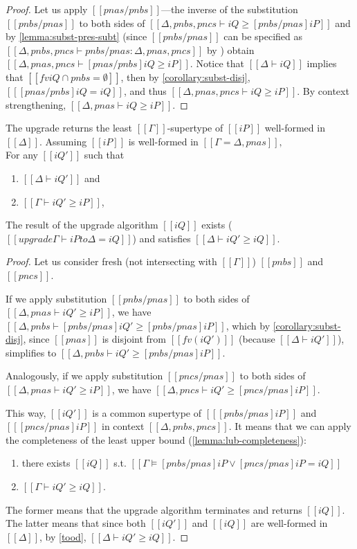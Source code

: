 \begin{proof}
    Let us apply $[[pnas/pnbs]]$---the inverse of the substitution $[[ pnbs/pnas ]]$ to 
    both sides of $[[Δ, pnbs, pncs ⊢ iQ ≥ [pnbs/pnas]iP]]$ and 
    by \cref{lemma:subst-pres-subt} 
    (since $[[pnbs/pnas]]$ can be specified as 
    $[[Δ,pnbs,pncs ⊢ pnbs/pnas : Δ, pnas, pncs]]$ by \label{lemma:subst-domain-weakening})
    obtain $[[Δ, pnas, pncs ⊢ [pnas/pnbs]iQ ≥ iP]]$.
    Notice that $[[Δ ⊢ iQ]]$ implies that $[[fv iQ ∩ {pnbs} = ∅]]$, 
    then by \cref{corollary:subst-disj}, $[[ [pnas/pnbs]iQ = iQ]]$,
     and thus $[[Δ, pnas, pncs ⊢ iQ ≥ iP]]$.
    By context strengthening, $[[Δ, pnas ⊢ iQ ≥ iP]]$.
\end{proof}

\begin{lemma} \label{lemma:upgrade-completeness}
    The upgrade returns the least $[[Γ]]$-supertype of $[[iP]]$ well-formed in $[[Δ]]$.
    Assuming $[[iP]]$ is well-formed in $[[Γ = Δ, pnas]],$\\
    For any $[[iQ']]$ such that 
    \begin{enumerate}
        \item $[[Δ ⊢ iQ']]$ and
        \item $[[Γ ⊢ iQ' ≥ iP]]$,
    \end{enumerate}

    The result of the upgrade algorithm $[[iQ]]$ exists
    ($[[upgrade Γ ⊢ iP to Δ = iQ]]$) and satisfies $[[Δ ⊢ iQ' ≥ iQ]]$.
\end{lemma}
\begin{proof}

    Let us consider fresh (not intersecting with $[[Γ]]$) $[[pnbs]]$ and $[[pncs]]$.

    If we apply substitution $[[pnbs/pnas]]$ to both sides of $[[Δ, pnas ⊢ iQ' ≥ iP]]$,
    we have $[[Δ, pnbs ⊢ [pnbs/pnas]iQ' ≥ [pnbs/pnas]iP]]$, which by  
    \cref{corollary:subst-disj}, since $[[pnas]]$ is disjoint from $[[fv(iQ')]]$
    (because $[[Δ ⊢ iQ']]$), simplifies to $[[Δ, pnbs ⊢ iQ' ≥ [pnbs/pnas]iP]]$.

    Analogously, if we apply substitution $[[pncs/pnas]]$ to both sides of $[[Δ, pnas ⊢ iQ' ≥ iP]]$,
    we have $[[Δ, pncs ⊢ iQ' ≥ [pncs/pnas]iP]]$.

    This way, $[[iQ']]$ is a common supertype of $[[ [pnbs/pnas]iP ]]$ and $[[ [pncs/pnas]iP ]]$ in
    context $[[Δ, pnbs, pncs]]$. It means that we can apply the completeness of the least upper bound
    (\cref{lemma:lub-completeness}):
    \begin{enumerate}
        \item there exists $[[iQ]]$ s.t. $[[Γ ⊨ [pnbs/pnas]iP ∨ [pncs/pnas]iP = iQ]]$ 
        \item $[[Γ ⊢ iQ' ≥ iQ]]$.
    \end{enumerate}
    The former means that the upgrade algorithm terminates and returns $[[iQ]]$.
    The latter means that since both $[[iQ']]$ and $[[iQ]]$ are well-formed in $[[Δ]]$,
    by \cref{tood}, $[[Δ ⊢ iQ' ≥ iQ]]$.
\end{proof}


